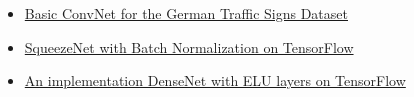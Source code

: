 \documentclass[]{article}
\begin{document}
\begin{itemize}
\itemsep1pt\parskip0pt
\item
  \href{https://github.com/cgarciae/supervised-avanzado-german-traffic-signs/tree/feature/solucion-basica}{Basic
  ConvNet for the German Traffic Signs Dataset}
\item
  \href{https://github.com/cgarciae/supervised-avanzado-german-traffic-signs/tree/feature/batch-norm-squeeze-net}{SqueezeNet
  with Batch Normalization on TensorFlow}
\item
  \href{https://github.com/cgarciae/supervised-avanzado-german-traffic-signs/tree/feature/dense-net-elu-2}{An
  implementation DenseNet with ELU layers on TensorFlow}
\end{itemize}
\end{document}
